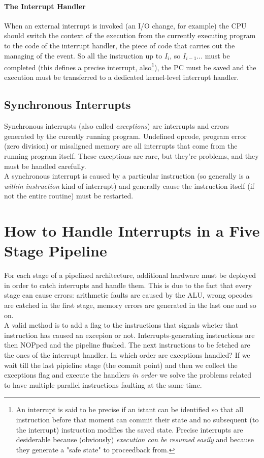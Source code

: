 \documentclass[10pt,a4paper]{article}
\begin{document}
				\paragraph{The Interrupt Handler}
					When an external interrupt is invoked (an I/O change, for example) the CPU should switch the context of the execution from the currently executing program to the code of the interrupt handler, the piece of code that carries out the managing of the event. So all the instruction up to $I_i$, so $I_{i-1}...$ must be completed (this defines a precise interrupt, also\footnote{An interrupt is said to be precise if an istant can be identified so that all instruction before that moment can commit their state and no subsequent (to the interrupt) instruction modifies the saved state. Precise interrupts are desiderable because (obviously) \emph{execution can be resumed easily} and because they generate a "safe state" to proceedback from.}), the PC must be saved and the execution must be transferred to a dedicated kernel-level interrupt handler. 
				
			\subsection{Synchronous Interrupts}
				Synchronous interrupts (also called \emph{exceptions}) are interrupts and errors generated by the curently running program. Undefined opcode, program error (zero division) or misaligned memory are all interrupts that come from the running program itself. These exceptions are rare, but they're problems, and they must be handled carefully.\\
				A synchronous interrupt is caused by a particular instruction (so generally is a \emph{within instruction} kind of interrupt) and generally cause the instruction itself (if not the entire routine) must be restarted. 

		\section{How to Handle Interrupts in a Five Stage Pipeline}
			For each stage of a pipelined architecture, additional hardware must be deployed in order to catch interrupts and handle them. This is due to the fact that every stage can cause errors: arithmetic faults are caused by the ALU, wrong opcodes are catched in the first stage, memory errors are generated in the last one and so on.\\
			A valid method is to add a flag to the instructions that signals wheter that instruction has caused an excepion or not. Interrupts-generating instructions are then NOPped and the pipeline flushed. The next instructions to be fetched are the ones of the interrupt handler. In which order are exceptions handled? If we wait till the last pipieline stage (the commit point) and then we collect the exceptions flag and execute the handlers \emph{in order} we solve the problems related to have multiple parallel instructions faulting at the same time.
\end{document}
